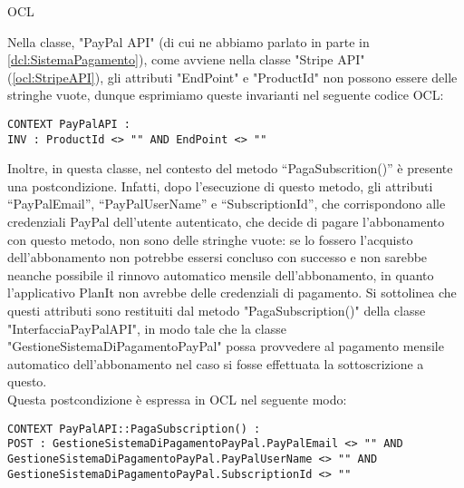 \begin{listaPersonale}{OCL}
    \begin{center}
        
    \end{center}
    Nella classe, "PayPal API" (di cui ne abbiamo parlato in parte in \ref{dcl:SistemaPagamento}), come avviene nella classe "Stripe API" (\ref{ocl:StripeAPI}), gli attributi "EndPoint" e "ProductId" non possono essere delle stringhe vuote, dunque esprimiamo queste invarianti nel seguente codice OCL:
    \begin{lstlisting}
CONTEXT PayPalAPI :
INV : ProductId <> "" AND EndPoint <> ""
    \end{lstlisting}
    Inoltre, in questa classe, nel contesto del metodo “PagaSubscrition()” è presente una postcondizione. Infatti, dopo l'esecuzione di questo metodo, gli attributi “PayPalEmail”, “PayPalUserName” e “SubscriptionId”, che corrispondono alle credenziali PayPal dell'utente autenticato, che decide di pagare l'abbonamento con questo metodo, non sono delle stringhe vuote: se lo fossero l'acquisto dell'abbonamento non potrebbe essersi concluso con successo e non sarebbe neanche possibile il rinnovo automatico mensile dell'abbonamento, in quanto l'applicativo PlanIt non avrebbe delle credenziali di pagamento. Si sottolinea che questi attributi sono restituiti dal metodo "PagaSubscription()" della classe "InterfacciaPayPalAPI", in modo tale che la classe "GestioneSistemaDiPagamentoPayPal" possa provvedere al pagamento mensile automatico dell'abbonamento nel caso si fosse effettuata la sottoscrizione a questo.\\
    Questa postcondizione è espressa in OCL nel seguente modo:
    \begin{lstlisting}
CONTEXT PayPalAPI::PagaSubscription() :
POST : GestioneSistemaDiPagamentoPayPal.PayPalEmail <> "" AND GestioneSistemaDiPagamentoPayPal.PayPalUserName <> "" AND GestioneSistemaDiPagamentoPayPal.SubscriptionId <> ""
    \end{lstlisting}
    \newpage





\end{listaPersonale}
